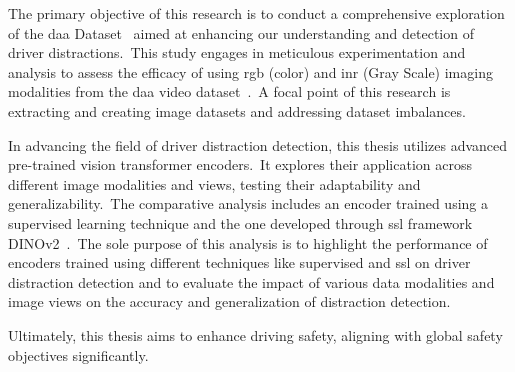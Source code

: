 The primary objective of this research is to conduct a comprehensive exploration of the \gls{daa} Dataset~\citep{martin2019drive_and_act_2019_iccv} aimed at enhancing our understanding and detection of driver distractions.~This study engages in meticulous experimentation and analysis to assess the efficacy of using \gls{rgb} (color) and \gls{inr} (Gray Scale) imaging modalities from the \gls{daa} video dataset~\citep{martin2019drive_and_act_2019_iccv}.~A focal point of this research is extracting and creating image datasets and addressing dataset imbalances.

In advancing the field of driver distraction detection, this thesis utilizes advanced pre-trained vision transformer encoders.~It explores their application across different image modalities and views, testing their adaptability and generalizability.~The comparative analysis includes an encoder trained using a supervised learning technique and the one developed through \gls{ssl} framework DINOv2~\citep{dinov2_oquab2023dinov2}.~The sole purpose of this analysis is to highlight the performance of encoders trained using different techniques like supervised and \gls{ssl} on driver distraction detection and to evaluate the impact of various data modalities and image views on the accuracy and generalization of distraction detection.

Ultimately, this thesis aims to enhance driving safety, aligning with global safety objectives significantly.

